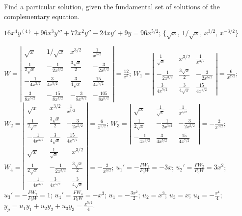\documentclass{ximera}
\begin{document}
\begin{problem}\label{exer:9.4.14}
Find a particular
solution, given the fundamental set of solutions of the complementary equation.

$16x^4y^{(4)}+96x^3y'''+72x^2y''-24xy'+9y=96x^{5/2}$; \quad
$\{\sqrt x,\,1/\sqrt x,\,x^{3/2},\,x^{-3/2}\}$

\begin{solution}
$W=\left|\begin{array}{cccc}
\sqrt{x}&1/\sqrt{x}&x^{3/2}&\frac{1}{x^{3/2}}
\\\frac{1}{2\sqrt{x}}&-\frac{1}{2x^{3/2}}&\frac{3\sqrt{x}}{2}&-\frac{3}{2x^{5/2}}\\
-\frac{1}{4x^{3/2}}&\frac{3}{4x^{5/2}}&\frac{3}{4\sqrt{x}}&\frac{15}{4x^{7/2}}\\
\frac{3}{8x^{5/2}}&-\frac{15}{8x^{7/2}}&-\frac{3}{8x^{3/2}}&-\frac{105}{8x^{9/2}}
\end{array}\right|=\frac{12}{x^6}$;
$W_1=
\left|\begin{array}{cccc}
\frac{1}{\sqrt{x}}&x^{3/2}&\frac{1}{x^{3/2}}\\
-\frac{1}{2x^{3/2}}&\frac{3\sqrt{x}}{2}&-\frac{3}{2x^{5/2}}\\
\frac{3}{4x^{5/2}}&\frac{3}{4\sqrt{x}}&\frac{15}{4x^{7/2}}
\end{array}\right|=\frac{6}{x^{7/2}}$;
$W_2=\left|\begin{array}{cccc}
\sqrt{x}&x^{3/2}&\frac{1}{x^{3/2}}\\
\frac{1}{2\sqrt{x}}&\frac{3\sqrt{x}}{2}&-\frac{3}{2x^{5/2}}\\
-\frac{1}{4x^{3/2}}&\frac{3}{4\sqrt{x}}&\frac{15}{4x^{7/2}}
\end{array}\right|=\frac{6}{x^{5/2}}$;
$W_3=\left|\begin{array}{cccc}
\sqrt{x}&\frac{1}{\sqrt{x}}&\frac{1}{x^{3/2}}\\
\frac{1}{2\sqrt{x}}&-\frac{1}{2x^{3/2}}&-\frac{3}{2x^{5/2}}\\
-\frac{1}{4x^{3/2}}&\frac{3}{4x^{5/2}}&\frac{15}{4x^{7/2}}
\end{array}\right|=-\frac{2}{x^{9/2}}$;
$W_4=\left|\begin{array}{cccc}
\sqrt{x}&\frac{1}{\sqrt{x}}&x^{3/2}\\
\frac{1}{2\sqrt{x}}&-\frac{1}{2x^{3/2}}&\frac{3\sqrt{x}}{2}\\
-\frac{1}{4x^{3/2}}&\frac{3}{4x^{5/2}}&\frac{3}{4\sqrt{x}}
\end{array}\right|=-\frac{2}{x^{3/2}}$;
$u_1'=-\frac{FW_1}{P_0W}=-3x$;
$u_2'=\frac{FW_2}{P_0W}=3x^2$;
$u_3'=-\frac{FW_2}{P_0W}=1$;
$u_4'=\frac{FW_4}{P_0W}=-x^3$;
$u_1=-\frac{3x^2}{2}$;
$u_2=x^3$;
$u_3=x$;
$u_4=-\frac{x^4}{4}$;
$y_p=u_1y_1+u_2y_2+u_3y_3=\frac{x^{5/2}}{4}$. 
\end{solution}
\end{problem}
\end{document}
